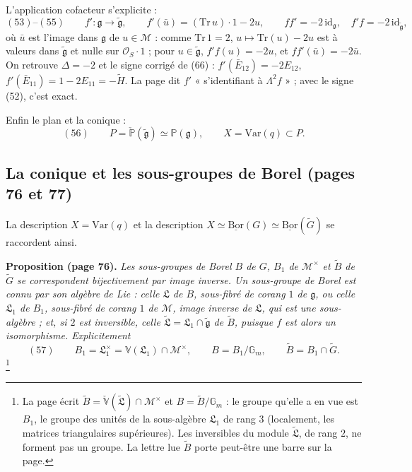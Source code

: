 \documentclass[11pt,a4paper]{article}
\begin{document}
L'application cofacteur s'explicite :
\[
  (53)\text{--}(55) \qquad f' : \mathfrak{g} \longrightarrow \widetilde{\mathfrak{g}} , \qquad
  f'(\bar{u}) = (\mathrm{Tr}\,u)\cdot 1 - 2u , \qquad ff' = -2\,\mathrm{id}_{\mathfrak{g}} , \quad f'f = -2\,\mathrm{id}_{\widetilde{\mathfrak{g}}} ,
\]
où $\bar{u}$ est l'image dans $\mathfrak{g}$ de $u \in \mathcal{M}$ : comme $\mathrm{Tr}\,1 = 2$,
$u \mapsto \mathrm{Tr}(u) - 2u$ est à valeurs dans $\widetilde{\mathfrak{g}}$ et nulle sur
$\mathcal{O}_S\cdot 1$ ; pour $u \in \widetilde{\mathfrak{g}}$, $f'f(u) = -2u$, et
$ff'(\bar{u}) = -2\bar{u}$. On retrouve $\Delta = -2$ et le signe corrigé de (66) :
$f'(\bar{E}_{12}) = -2E_{12}$, $f'(\bar{E}_{11}) = 1 - 2E_{11} = -\widetilde{H}$.
La page dit $f'$ « s'identifiant à $\Lambda^2 f$ » ; avec le signe (52), c'est
exact.

Enfin le plan et la conique :
\[
  (56) \qquad P = \check{\mathbb{P}}(\widetilde{\mathfrak{g}}) \simeq \mathbb{P}(\mathfrak{g}) , \qquad
  X = \mathrm{Var}(q) \subset P .
\]

\subsection*{La conique et les sous-groupes de Borel (pages 76 et 77)}

La description $X = \mathrm{Var}(q)$ et la description
$X \simeq \underline{\mathrm{Bor}}(G) \simeq \underline{\mathrm{Bor}}(\widetilde{G})$ se raccordent
ainsi.

\textbf{Proposition (page 76).} \emph{Les sous-groupes de Borel $B$ de $G$, $B_1$ de
$\mathcal{M}^{\times}$ et $\widetilde{B}$ de $\widetilde{G}$ se correspondent bijectivement par
image inverse. Un sous-groupe de Borel est connu par son algèbre de Lie : celle
$\mathfrak{L}$ de $B$, sous-fibré de corang $1$ de $\mathfrak{g}$, ou celle
$\mathfrak{L}_1$ de $B_1$, sous-fibré de corang $1$ de $\mathcal{M}$, image inverse de
$\mathfrak{L}$, qui est une sous-algèbre ; et, si $2$ est inversible, celle
$\widetilde{\mathfrak{L}} = \mathfrak{L}_1 \cap \widetilde{\mathfrak{g}}$ de $\widetilde{B}$, puisque
$f$ est alors un isomorphisme. Explicitement}
\[
  (57) \qquad B_1 = \mathfrak{L}_1^{\times} = \mathbb{V}(\mathfrak{L}_1) \cap \mathcal{M}^{\times} , \qquad
  B = B_1/\mathbb{G}_m , \qquad \widetilde{B} = B_1 \cap \widetilde{G} .
\]
\footnote{La page écrit $\widetilde{B} = \check{\mathbb{V}}(\widetilde{\mathfrak{L}}) \cap
\mathcal{M}^{\times}$ et $B = \widetilde{B}/\mathbb{G}_m$ : le groupe qu'elle a en vue est $B_1$,
le groupe des unités de la sous-algèbre $\mathfrak{L}_1$ de rang $3$ (localement,
les matrices triangulaires supérieures). Les inversibles du module
$\widetilde{\mathfrak{L}}$, de rang $2$, ne forment pas un groupe. La lettre lue
$\widetilde{B}$ porte peut-être une barre sur la page.}
\end{document}
